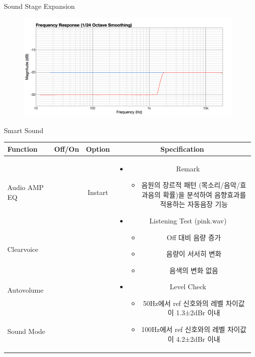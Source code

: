 \documentclass{beamer}
\begin{document}
\begin{frame}[t]{Sound Stage Expansion}
\begin{figure}[b]
\includegraphics[height=0.32\textwidth]{figure/sxp.png}
\end{figure}

\end{frame}


\begin{frame}[t]{Smart Sound}
\begin{tiny}
\begin{tabular}{@{}lccc@{}}
\toprule
Function & Off/On & Option & Specification \\
\midrule
Audio AMP EQ & \color{black}{Off} & Instart &
\multirow{14}{60mm}{
\begin{itemize}
\item Remark
	\begin{itemize}
	\item 음원의 장르적 패턴 (목소리/음악/효과음의 확률)을 분석하여 음향효과를 적용하는 자동음장 기능
	\end{itemize}
\item Listening Test (pink.wav)
	\begin{itemize}
	\item Off 대비 음량 증가
	\item 음량이 서서히 변화
	\item 음색의 변화 없음
	\end{itemize}
\item Level Check
  \begin{itemize}
  \item 50Hz에서 ref 신호와의 레벨 차이값이 1.3±2dBr 이내
  \item 100Hz에서 ref 신호와의 레벨 차이값이 4.2±2dBr 이내
  \end{itemize}
\end{itemize}
} \\
Clearvoice & \color{black}{Off} & & \\
Autovolume & \color{black}{Off} & & \\
Sound Mode & \color{black}{Off} & & \\

\end{tabular}
\end{tiny}
\end{frame}
\end{document}

